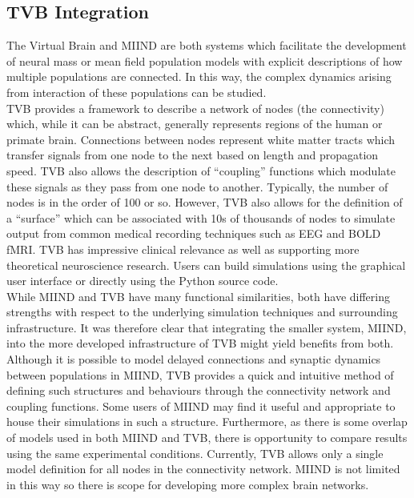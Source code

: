 \documentclass[utf8]{frontiersSCNS} %
\begin{document}
\subsection*{TVB Integration}
\label{tvbintegration}
The Virtual Brain \citep{sanz2013virtual} and MIIND are both systems which facilitate the development of neural mass or mean field population models with explicit descriptions of how multiple populations are connected. In this way, the complex dynamics arising from interaction of these populations can be studied.\\ 
TVB provides a framework to describe a network of nodes (the connectivity) which, while it can be abstract, generally represents regions of the human or primate brain. Connections between nodes represent white matter tracts which transfer signals from one node to the next based on length and propagation speed. TVB also allows the description of ``coupling'' functions which modulate these signals as they pass from one node to another. Typically, the number of nodes is in the order of 100 or so. However, TVB also allows for the definition of a ``surface'' which can be associated with 10s of thousands of nodes to simulate output from common medical recording techniques such as EEG and BOLD fMRI. TVB has impressive clinical relevance as well as supporting more theoretical neuroscience research. Users can build simulations using the graphical user interface or directly using the Python source code.\\ 
While MIIND and TVB have many functional similarities, both have differing strengths with respect to the underlying simulation techniques and surrounding infrastructure. It was therefore clear that integrating the smaller system, MIIND, into the more developed infrastructure of TVB might yield benefits from both.
Although it is possible to model delayed connections and synaptic dynamics between populations in MIIND, TVB provides a quick and intuitive method of defining such structures and behaviours through the connectivity network and coupling functions. Some users of MIIND may find it useful and appropriate to house their simulations in such a structure. Furthermore, as there is some overlap of models used in both MIIND and TVB, there is opportunity to compare results using the same experimental conditions. Currently, TVB allows only a single model definition for all nodes in the connectivity network. MIIND is not limited in this way so there is scope for developing more complex brain networks.\\
\end{document}
